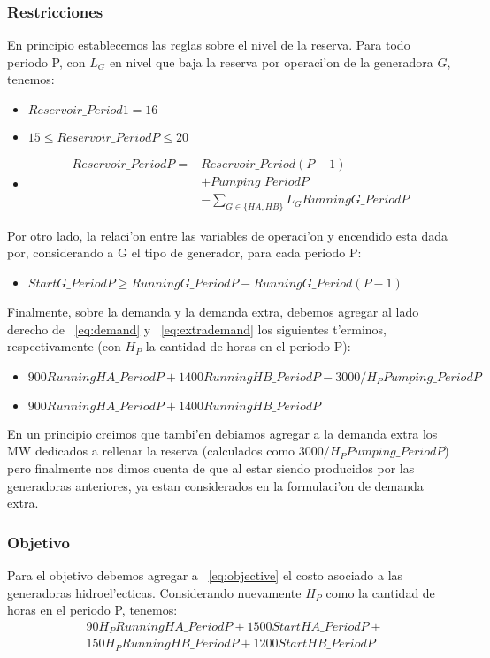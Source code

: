 \subsubsection{Restricciones}
En principio establecemos las reglas sobre el nivel de la reserva. Para todo periodo P, con $L_{G}$ en nivel que baja la reserva por operaci'on de la generadora $G$, tenemos:
\begin{itemize}
\item $Reservoir\_Period1 = 16$
\item $15 \leq Reservoir\_PeriodP \leq 20$
\item{
\begin{equation}
\begin{aligned}
Reservoir\_PeriodP = & Reservoir\_Period(P-1) \\
				& + Pumping\_PeriodP \\
				& - \sum_{G \in \{HA,HB\}} L_{G} RunningG\_PeriodP
\end{aligned}
\end{equation}
}
\end{itemize}
Por otro lado, la relaci'on entre las variables de operaci'on y encendido esta dada por, considerando a G el tipo de generador, para cada periodo P:
\begin{itemize}
\item $StartG\_PeriodP \geq RunningG\_PeriodP - RunningG\_Period(P-1)$
\end{itemize}
Finalmente, sobre la demanda y la demanda extra, debemos agregar al lado derecho de ~\ref{eq:demand} y ~\ref{eq:extrademand} los siguientes t'erminos, respectivamente (con $H_{P}$ la cantidad de horas en el periodo P):
\begin{itemize}
\item $900 RunningHA\_PeriodP + 1400 RunningHB\_PeriodP - 3000/H_{P} Pumping\_PeriodP$
\item $900 RunningHA\_PeriodP + 1400 RunningHB\_PeriodP$
\end{itemize}
En un principio creimos que tambi'en debiamos agregar a la demanda extra los MW dedicados a rellenar la reserva (calculados como $3000/H_{P} Pumping\_PeriodP$) pero finalmente nos dimos cuenta de que al estar siendo producidos por las generadoras anteriores, ya estan considerados en la formulaci'on de demanda extra. 
\subsubsection{Objetivo}
Para el objetivo debemos agregar a ~\ref{eq:objective} el costo asociado a las generadoras hidroel'ecticas. Considerando nuevamente $H_{P}$ como la cantidad de horas en el periodo P, tenemos:
\begin{equation} \label{eq:extendedobjective}
\begin{aligned}
& 90 H_{P} RunningHA\_PeriodP + 1500 StartHA\_PeriodP +\\
& 150 H_{P} RunningHB\_PeriodP + 1200 StartHB\_PeriodP \\
\end{aligned}
\end{equation}
